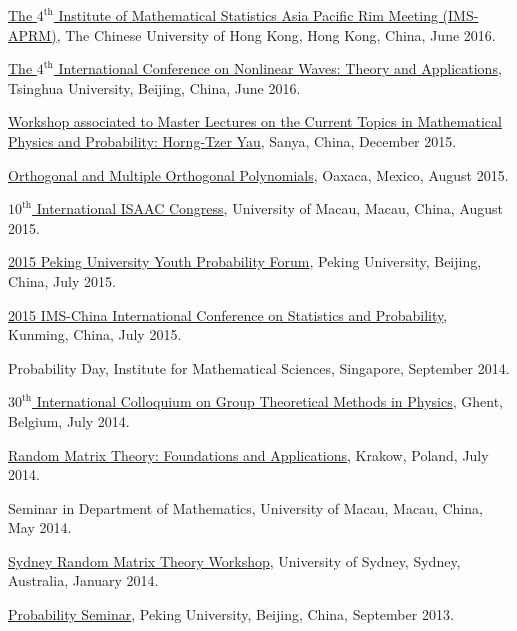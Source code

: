 \documentclass[12pt,a4paper]{article}
\newenvironment{item_list}{
 \begin{list}{}{
   \setlength{\leftmargin}{1.5em}
   \setlength{\itemsep}{0.25em}
   \setlength{\parskip}{0pt}
   \setlength{\parsep}{0.25em}
 }
}{
 \end{list}
}
\begin{document}
\begin{item_list}
\item
  \href{http://ims-aprm2016.sta.cuhk.edu.hk/}{The $4^{\text{th}}$ Institute of Mathematical Statistics Asia Pacific Rim Meeting (IMS-APRM)}, The Chinese University of Hong Kong, Hong Kong, China, June 2016.
\item
  \href{http://icnwta4.csp.escience.cn/dct/page/1}{The $4^{\text{th}}$ International Conference on Nonlinear Waves: Theory and Applications}, Tsinghua University, Beijing, China, June 2016.
\item
  \href{http://ymsc.tsinghua.edu.cn/sanya/2016/MHTY2016/synopsis_and_organizers.aspx}{Workshop associated to Master Lectures on the Current Topics in Mathematical Physics and Probability: Horng-Tzer Yau}, Sanya, China, December 2015.
\item
  \href{http://www.birs.ca/events/2015/5-day-workshops/15w5022}{Orthogonal and Multiple Orthogonal Polynomials}, Oaxaca, Mexico, August 2015.
\item
  \href{http://www.fst.umac.mo/conference/isaac2015/}{$10^{\text{th}}$ International ISAAC Congress}, University of Macau, Macau, China, August 2015.
\item
  \href{http://www.math.pku.edu.cn/teachers/liuyong/2015forum/admin/html/default.php}{2015 Peking University Youth Probability Forum}, Peking University, Beijing, China, July 2015.
\item
  \href{http://www.2015imschina.com/}{2015 IMS-China International Conference on Statistics and Probability}, Kunming, China, July 2015.
\item
  Probability Day, Institute for Mathematical Sciences, Singapore, September 2014.
\item \href{http://th-www.if.uj.edu.pl/~matrix2014/index.html}{$30^{\text{th}}$ International Colloquium on Group Theoretical Methods in Physics}, Ghent, Belgium, July 2014.
\item
  \href{http://th-www.if.uj.edu.pl/~matrix2014/index.html}{Random Matrix Theory: Foundations and Applications}, Krakow, Poland, July 2014.
\item
  Seminar in Department of Mathematics, University of Macau, Macau, China, May 2014.
\item
  \href{http://www.maths.usyd.edu.au/u/olver/conferences/RMT.html}{Sydney Random Matrix Theory Workshop}, University of Sydney, Sydney, Australia, January 2014. 
\item
  \href{http://www.math.pku.edu.cn/teachers/liuyong/seminarC.htm}{Probability Seminar}, Peking University, Beijing, China, September 2013.

\end{item_list}
\end{document}
